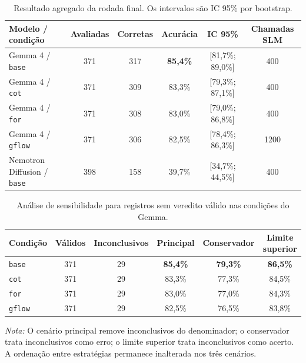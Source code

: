 \documentclass[12pt]{article}
\begin{document}
\begin{table}[H]
\centering
\scriptsize
\setlength{\tabcolsep}{3pt}
\renewcommand{\arraystretch}{1.15}
\caption{Resultado agregado da rodada final. Os intervalos são IC 95\% por bootstrap.}
\label{tab:resultado-final-agregado}
\begin{tabular}{|p{4.0cm}|c|c|c|c|c|}
\hline
\textbf{Modelo / condição} & \textbf{Avaliadas} & \textbf{Corretas} & \textbf{Acurácia} & \textbf{IC 95\%} & \textbf{Chamadas SLM} \\
\hline
Gemma 4 / \texttt{base} & 371 & 317 & \textbf{85,4\%} & [81,7\%; 89,0\%] & 400 \\
Gemma 4 / \texttt{cot} & 371 & 309 & 83,3\% & [79,3\%; 87,1\%] & 400 \\
Gemma 4 / \texttt{for} & 371 & 308 & 83,0\% & [79,0\%; 86,8\%] & 400 \\
Gemma 4 / \texttt{gflow} & 371 & 306 & 82,5\% & [78,4\%; 86,3\%] & 1200 \\
Nemotron Diffusion / \texttt{base} & 398 & 158 & 39,7\% & [34,7\%; 44,5\%] & 400 \\
\hline
\end{tabular}
\end{table}

\begin{table}[H]
\centering
\scriptsize
\setlength{\tabcolsep}{4pt}
\renewcommand{\arraystretch}{1.15}
\caption{Análise de sensibilidade para registros sem veredito válido nas condições do Gemma.}
\label{tab:sensibilidade-inconclusivos}
\begin{tabular}{|p{2.0cm}|c|c|c|c|c|}
\hline
\textbf{Condição} & \textbf{Válidos} & \textbf{Inconclusivos} & \textbf{Principal} & \textbf{Conservador} & \textbf{Limite superior} \\
\hline
\texttt{base} & 371 & 29 & \textbf{85,4\%} & \textbf{79,3\%} & \textbf{86,5\%} \\
\texttt{cot} & 371 & 29 & 83,3\% & 77,3\% & 84,5\% \\
\texttt{for} & 371 & 29 & 83,0\% & 77,0\% & 84,3\% \\
\texttt{gflow} & 371 & 29 & 82,5\% & 76,5\% & 83,8\% \\
\hline
\end{tabular}
\par\vspace{0.4em}
\begin{minipage}{0.95\textwidth}
\footnotesize\textit{Nota:} O cenário principal remove inconclusivos do denominador; o conservador trata inconclusivos como erro; o limite superior trata inconclusivos como acerto. A ordenação entre estratégias permanece inalterada nos três cenários.
\end{minipage}
\end{table}
\end{document}
